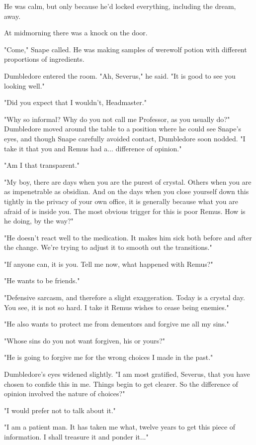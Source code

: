 He was calm, but only because he'd locked everything, including the dream, away.

At midmorning there was a knock on the door.

"Come," Snape called. He was making samples of werewolf potion with different proportions of ingredients.

Dumbledore entered the room. "Ah, Severus," he said. "It is good to see you looking well."

"Did you expect that I wouldn't, Headmaster."

"Why so informal? Why do you not call me Professor, as you usually do?" Dumbledore moved around the table to a position where he could see Snape's eyes, and though Snape carefully avoided contact, Dumbledore soon nodded. "I take it that you and Remus had a... difference of opinion."

"Am I that transparent."

"My boy, there are days when you are the purest of crystal. Others when you are as impenetrable as obsidian. And on the days when you close yourself down this tightly in the privacy of your own office, it is generally because what you are afraid of is inside you. The most obvious trigger for this is poor Remus. How is he doing, by the way?"

"He doesn't react well to the medication. It makes him sick both before and after the change. We're trying to adjust it to smooth out the transitions."

"If anyone can, it is you. Tell me now, what happened with Remus?"

"He wants to be friends."

"Defensive sarcasm, and therefore a slight exaggeration. Today is a crystal day. You see, it is not so hard. I take it Remus wishes to cease being enemies."

"He also wants to protect me from dementors and forgive me all my sins."

"Whose sins do you not want forgiven, his or yours?"

"He is going to forgive me for the wrong choices I made in the past."

Dumbledore's eyes widened slightly. "I am most gratified, Severus, that you have chosen to confide this in me. Things begin to get clearer. So the difference of opinion involved the nature of choices?"

"I would prefer not to talk about it."

"I am a patient man. It has taken me what, twelve years to get this piece of information. I shall treasure it and ponder it..."

